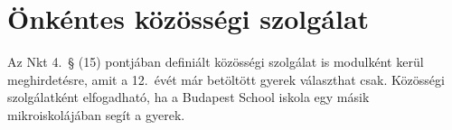 \section{Önkéntes közösségi szolgálat}

Az Nkt 4.~§ (15) pontjában definiált közösségi szolgálat is modulként
kerül meghirdetésre, amit a 12.~évét már betöltött gyerek választhat csak.
Közösségi szolgálatként elfogadható, ha a Budapest School iskola egy
másik mikroiskolájában segít a gyerek.
